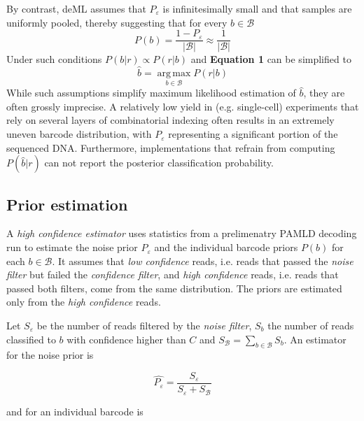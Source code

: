 \documentclass[10pt,twocolumn]{article}
\begin{document}
By contrast, deML \citep{doi:10.1093/bioinformatics/btu719} assumes that $P_{\varepsilon}$ is infinitesimally small and that samples are uniformly pooled, thereby suggesting that for every $b \in \mathcal{B}$
%
\begin{equation}
P(b) = \frac{1 - P_{\varepsilon}}{|\mathcal{B}|} %
\approx \frac{1}{|\mathcal{B}|}
\end{equation}
%
Under such conditions $P(b|r) \propto P(r|b)$ and \textbf{Equation 1} can be simplified to
%
\begin{equation}
\hat{b} = \operatorname*{arg\,max}_{b \in \mathcal{B}} P(r|b)
\end{equation}
%
While such assumptions simplify maximum likelihood estimation of $\hat{b}$, they are often grossly imprecise. A relatively low yield in (e.g. single-cell) experiments that rely on several layers of combinatorial indexing often results in an extremely uneven barcode distribution, with $P_{\varepsilon}$ representing a significant portion of the sequenced DNA. Furthermore, implementations that refrain from computing $P(\hat{b}|r)$ can not report the posterior classification probability.

\subsection*{Prior estimation}

A \emph{high confidence estimator} uses statistics from a prelimenatry PAMLD decoding run to estimate the noise prior $P_{\varepsilon}$ and the individual barcode priors $P(b)$ for each $b \in \mathcal{B}$. It assumes that \emph{low confidence} reads, i.e. reads that passed the \emph{noise filter} but failed the \emph{confidence filter}, and \emph{high confidence} reads, i.e. reads that passed both filters, come from the same distribution. The priors are estimated only from the \emph{high confidence} reads.

Let $S_{\varepsilon}$ be the number of reads filtered by the \emph{noise filter}, $S_{b}$ the number of reads classified to $b$ with confidence higher than $C$ and $S_\mathcal{B} = \sum_{b \in \mathcal{B}} S_{b}$. An estimator for the noise prior is

%
\begin{equation}
\hat{P_{\varepsilon}} = \frac{S_{\varepsilon}}{S_{\varepsilon} + S_\mathcal{B}}
\end{equation}
%

and for an individual barcode is
\end{document}
